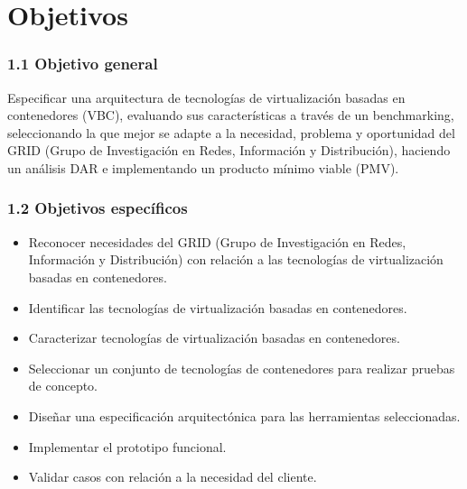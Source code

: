 \chapter*{Objetivos}

\subsection*{1.1 Objetivo general}
Especificar una arquitectura de tecnologías de virtualización basadas en contenedores (VBC), evaluando sus características a través de un benchmarking, seleccionando la que mejor se adapte a la necesidad, problema y oportunidad del GRID (Grupo de Investigación en Redes, Información y Distribución), haciendo un análisis DAR e implementando un producto mínimo viable (PMV).

\subsection*{1.2 Objetivos específicos}
\begin{itemize}
    \item Reconocer necesidades del GRID (Grupo de Investigación en Redes, Información y Distribución) con relación a las tecnologías de virtualización basadas en contenedores.
    \item Identificar las tecnologías de virtualización basadas en contenedores.
    \item Caracterizar tecnologías de virtualización basadas en contenedores.
    \item Seleccionar un conjunto de tecnologías de contenedores para realizar pruebas de concepto.
    \item Diseñar una especificación arquitectónica para las herramientas seleccionadas.
    \item Implementar el prototipo funcional.
    \item Validar casos con relación a la necesidad del cliente.
\end{itemize}